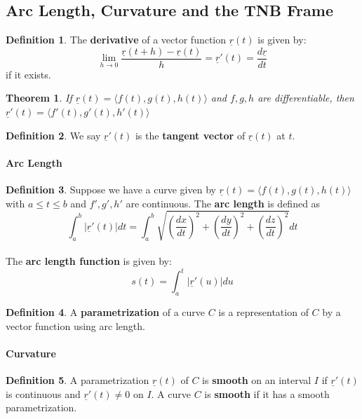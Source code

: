 \documentclass[12 pt]{article}
\newtheorem{thm}{Theorem}
\theoremstyle{definition}
\newtheorem{defn}{Definition}
\begin{document}
\subsection{Arc Length, Curvature and the TNB Frame}
\begin{defn}
	The \textbf{derivative} of a vector function $\underline{r}(t)$ is given by: 
	\begin{equation*}
			\lim_{h\to 0}\frac{\underline{r}(t+h)-\underline{r}(t)}{h}=\underline{r}'(t)=\frac{d\underline{r}}{dt}
	\end{equation*}
 if it exists.
\end{defn}
\begin{thm}
	If $\underline{r}(t)=\langle f(t),g(t),h(t)\rangle$ and $f,g,h$ are differentiable, then $\underline{r}'(t)=\langle f'(t),g'(t),h'(t)\rangle$
\end{thm}
\begin{defn}
	We say $\underline{r}'(t)$ is the \textbf{tangent vector} of $\underline{r}(t)$ at $t$.
\end{defn}
\paragraph{Arc Length}
\begin{defn}
	Suppose we have a curve given by $\underline{r}(t)=\langle f(t),g(t),h(t)\rangle$ with $a\leq t \leq b$ and $f',g',h'$ are continuous. The \textbf{arc length} is defined as $$\int_{a}^{b}|\underline{r}'(t)| dt=\int_{a}^{b}\sqrt{\left(\frac{dx}{dt}\right)^2+\left(\frac{dy}{dt}\right)^2+\left(\frac{dz}{dt}\right)^2} dt$$
	\\ The \textbf{arc length function} is given by: $$s(t)=\int_{a}^{t}|\underline{r}'(u)|du$$
\end{defn}
\begin{defn}
	A \textbf{parametrization} of a curve $C$ is a representation of $C$ by a vector function using arc length.
\end{defn}
\paragraph{Curvature} \begin{defn}
A parametrization $\underline{r}(t)$ of $C$ is \textbf{smooth} on an interval $I$ if $\underline{r}'(t)$ is continuous and $\underline{r}'(t)\neq 0$ on $I$. A curve $C$ is \textbf{smooth} if it has a smooth parametrization. 
\end{defn}
\end{document}
